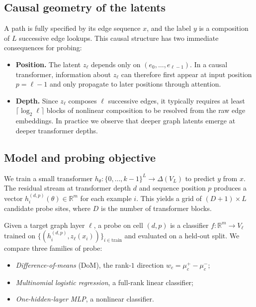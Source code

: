 \subsection*{Causal geometry of the latents}

A path is fully specified by its edge sequence $x$, and the label $y$ is a
composition of $L$ successive edge lookups. This causal structure has two
immediate consequences for probing:

\begin{itemize}
    \item \textbf{Position.} The latent $z_\ell$ depends only on
    $(e_0, \dots, e_{\ell-1})$. In a causal transformer, information about
    $z_\ell$ can therefore first appear at input position $p = \ell - 1$ and
    only propagate to later positions through attention.

    \item \textbf{Depth.} Since $z_\ell$ composes $\ell$ successive edges, it
    typically requires at least $\lceil \log_2 \ell \rceil$ blocks of nonlinear
    composition to be resolved from the raw edge embeddings. In practice we
    observe that deeper graph latents emerge at deeper transformer depths.
\end{itemize}

\subsection*{Model and probing objective}

We train a small transformer $h_\theta : \{0,\dots,k-1\}^L \to \Delta(V_L)$ to
predict $y$ from $x$. The residual stream at transformer depth $d$ and
sequence position $p$ produces a vector $h_i^{(d,p)}(\theta)\in\mathbb{R}^m$
for each example $i$. This yields a grid of $(D+1)\times L$ candidate probe
sites, where $D$ is the number of transformer blocks.

Given a target graph layer $\ell$, a probe on cell $(d, p)$ is a classifier
$f: \mathbb{R}^m \to V_\ell$ trained on
$\{(h_i^{(d, p)}, z_\ell(x_i))\}_{i \in \text{train}}$ and evaluated on a
held-out split. We compare three families of probe:
\begin{itemize}
    \item \emph{Difference-of-means} (DoM), the rank-$1$ direction
    $w_c = \mu_c^+ - \mu_c^-$;
    \item \emph{Multinomial logistic regression}, a full-rank linear classifier;
    \item \emph{One-hidden-layer MLP}, a nonlinear classifier.
\end{itemize}

